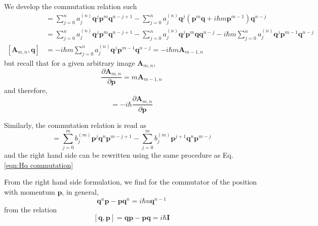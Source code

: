 \documentclass[a4paper]{article}
\theoremstyle{definition}
\begin{document}
We develop the commutation relation such
\begin{align}
	[\textbf{A}_{m,n},\textbf{q}]&=\sum_{j=0}^na_j^{(n)}\textbf{q}^{j}\textbf{p}^m\textbf{q}^{n-j+1}-\sum_{j=0}^na_j^{(n)}\textbf{q}^{j}(\textbf{p}^{m}\textbf{q}+i\hbar m\textbf{p}^{m-1})\textbf{q}^{n-j} \\
	&=\sum_{j=0}^na_j^{(n)}\textbf{q}^{j}\textbf{p}^m\textbf{q}^{n-j+1}-\sum_{j=0}^na_j^{(n)}\textbf{q}^{j}\textbf{p}^{m}\textbf{q}\textbf{q}^{n-j}-i\hbar m\sum_{j=0}^na_j^{(n)}\textbf{q}^{j}\textbf{p}^{m-1}\textbf{q}^{n-j}  \\
	[\textbf{A}_{m,n},\textbf{q}]&=-i\hbar m\sum_{j=0}^na_j^{(n)}\textbf{q}^{j}\textbf{p}^{m-1}\textbf{q}^{n-j}=-i\hbar m\textbf{A}_{m-1,n}
\end{align}
but recall that for a given arbitrary image $\textbf{A}_{m,n}$,
\begin{equation}
	\frac{\partial\textbf{A}_{m,n}}{\partial\textbf{p}}=m\textbf{A}_{m-1,n}
\end{equation}
and therefore,
\begin{equation}
	[\textbf{A}_{m,n},\textbf{q}]=-i\hbar \frac{\partial\textbf{A}_{m,n}}{\partial\textbf{p}}
\end{equation}

Similarly, the commutation relation is read as
\begin{equation}
	[\textbf{A}_{m,n},\textbf{p}]=\sum_{j=0}^mb_j^{(m)}\textbf{p}^j\textbf{q}^n\textbf{p}^{m-j+1}-\sum_{j=0}^mb_j^{(m)}\textbf{p}^{j+1}\textbf{q}^{n}\textbf{p}^{m-j}
\end{equation}
and the right hand side can be rewritten using the same procedure as Eq. \ref{eqn:Hq commutation}

From the right hand side formulation, we find for the commutator of the position with momentum $\textbf{p}$, in general, 
\begin{equation}
	\textbf{q}^n\textbf{p}-\textbf{p}\textbf{q}^n=i\hbar n\textbf{q}^{n-1}
\end{equation}
from the relation
\begin{equation}\label{eqn:Hq commutation2}
	[\textbf{q},\textbf{p}]=\textbf{q}\textbf{p}-\textbf{p}\textbf{q}=i\hbar\textbf{I}
\end{equation}
\end{document}
